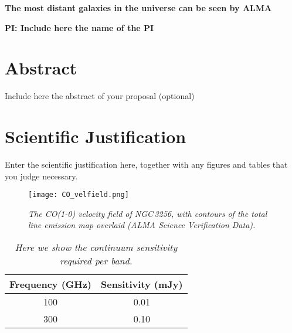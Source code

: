 \documentclass[12pt,a4paper]{article}
\begin{document}
\pagestyle{plain}
 

\begin{center}
{\LARGE{\bf
{The most distant galaxies in the universe can be seen by ALMA}
}}
\end{center}
\bigskip

\centerline{\bf PI: 
{Include here the name of the PI}}

\bigskip


\section{Abstract}
Include here the abstract of your proposal (optional)



\section{Scientific Justification}

Enter the scientific justification here, together with any figures and tables that you judge necessary.
 
\begin{figure}[tbh]
\texttt{[image: CO\_velfield.png]}
\caption{\em{The CO(1-0) velocity field of NGC\,3256, with contours 
of the total line emission map overlaid (ALMA Science Verification Data).
}}
\end{figure}

\begin{table}[tbh]
\begin{center}
\caption[]{\em{Here we show the continuum sensitivity required per band.}}
\begin{tabular}{cc}
\hline \noalign {\smallskip}
Frequency (GHz) & Sensitivity (mJy) \\
\hline \noalign {\smallskip}
100 & 0.01 \\
300 & 0.10 \\
\end{tabular}
\end{center}
\end{table}
\end{document}
